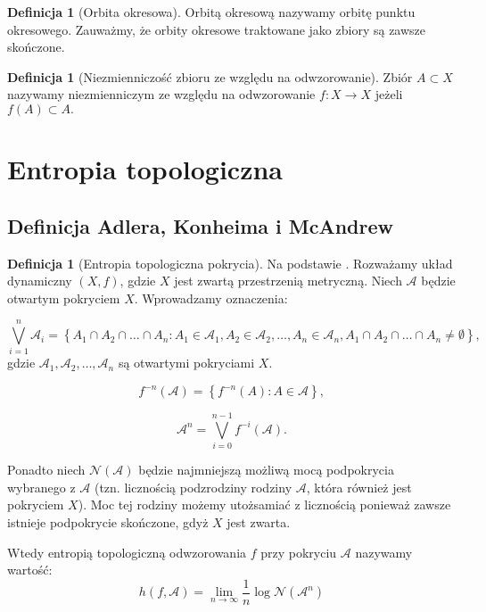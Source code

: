 \documentclass[licencjacka]{pwr_wmat_praca_dyplomowa}
\theoremstyle{plain}
\numberwithin{theorem}{chapter}
\theoremstyle{definition}
\numberwithin{theorem}{chapter}
\newtheorem{definition}[theorem]{Definicja}
\begin{document}
\begin{definition}[Orbita okresowa]
Orbitą okresową nazywamy orbitę punktu okresowego. Zauważmy, że orbity okresowe traktowane jako zbiory są zawsze skończone.
\end{definition}

\begin{definition}[Niezmienniczość zbioru ze względu na odwzorowanie]
Zbiór $A \subset X$ nazywamy niezmienniczym ze względu na odwzorowanie $f: X \rightarrow X$ jeżeli $f(A) \subset A.$
\end{definition}



\section{Entropia topologiczna}

\subsection{Definicja Adlera, Konheima i McAndrew}

\begin{definition}[Entropia topologiczna pokrycia]
Na podstawie \cite{misiurewicz1993}.
Rozważamy układ dynamiczny $(X, f)$, gdzie $X$ jest zwartą przestrzenią metryczną. Niech $\mathcal{A}$ będzie otwartym pokryciem $X$.
Wprowadzamy oznaczenia:

$$\bigvee_{i=1}^n \mathcal{A}_i = \left\{A_1 \cap A_2 \cap \ldots \cap A_n : A_1 \in \mathcal{A}_1, A_2 \in \mathcal{A}_2, \ldots, A_n \in \mathcal{A}_n, A_1 \cap A_2 \cap \ldots \cap A_n \neq \emptyset \right\},$$ 
gdzie $\mathcal{A}_1, \mathcal{A}_2, \ldots, \mathcal{A}_n$ są otwartymi pokryciami $X$.

$$f^{-n}(\mathcal{A}) = \left\{f^{-n}(A):A\in \mathcal{A}\right\},$$

$$\mathcal{A}^n = \bigvee_{i=0}^{n-1}f^{-i}(\mathcal{A}).$$

Ponadto niech $\mathcal{N}(\mathcal{A})$ będzie najmniejszą możliwą mocą podpokrycia wybranego z $\mathcal{A}$ (tzn. licznością podzrodziny rodziny $\mathcal{A}$, która również jest pokryciem $X$). Moc tej rodziny możemy utożsamiać z licznością ponieważ zawsze istnieje podpokrycie skończone, gdyż $X$ jest zwarta.

Wtedy entropią topologiczną odwzorowania $f$ przy pokryciu $\mathcal{A}$ nazywamy wartość:
$$h(f, \mathcal{A}) = \lim_{n \rightarrow \infty}{\frac{1}{n}\log\mathcal{N}(\mathcal{A}^n)}$$
\end{definition}
\end{document}
